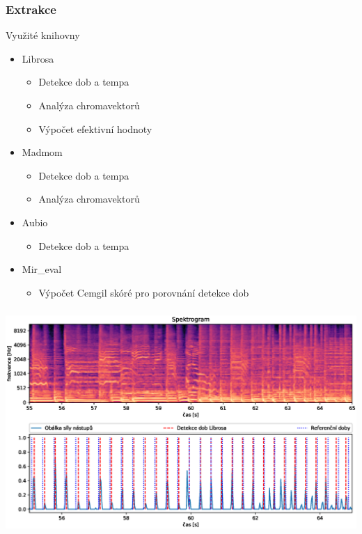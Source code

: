 \documentclass[%
  12pt,       				%
	t,                  %
	aspectratio=1610,   %
	unicode,						%
]{beamer}				    	%
\begin{document}
\begin{frame}
	\frametitle{Extrakce}
	\begin{block}{Využité knihovny}
		\begin{itemize}
			\item Librosa
				\begin{itemize}
					\item Detekce dob a tempa
					\item Analýza chromavektorů
					\item Výpočet efektivní hodnoty
				\end{itemize}
			\item Madmom
				\begin{itemize}
					\item Detekce dob a tempa
					\item Analýza chromavektorů
				\end{itemize}
			\item Aubio
				\begin{itemize}
					\item Detekce dob a tempa
				\end{itemize}
			\item Mir\_eval
				\begin{itemize}
					\item Výpočet Cemgil skóré pro porovnání detekce dob
				\end{itemize}
		\end{itemize}
	\end{block}
\end{frame}

\begin{frame}
	\frametitle{}
	\centering
	\includegraphics[width = 1\columnwidth]{obrazky/Beat_track_presentation.eps}
\end{frame}
\end{document}
